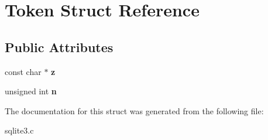 \hypertarget{struct_token}{\section{Token Struct Reference}
\label{struct_token}
}
\subsection*{Public Attributes}
\begin{DoxyCompactItemize}
\item 
\hypertarget{struct_token_a57b502141e3018e4a02773424acb4ffd}{const char $\ast$ {\bfseries z}}\label{struct_token_a57b502141e3018e4a02773424acb4ffd}

\item 
\hypertarget{struct_token_ad8442439e00ab9713a9b91a53e44c2aa}{unsigned int {\bfseries n}}\label{struct_token_ad8442439e00ab9713a9b91a53e44c2aa}

\end{DoxyCompactItemize}


The documentation for this struct was generated from the following file\-:\begin{DoxyCompactItemize}
\item 
sqlite3.\-c\end{DoxyCompactItemize}
